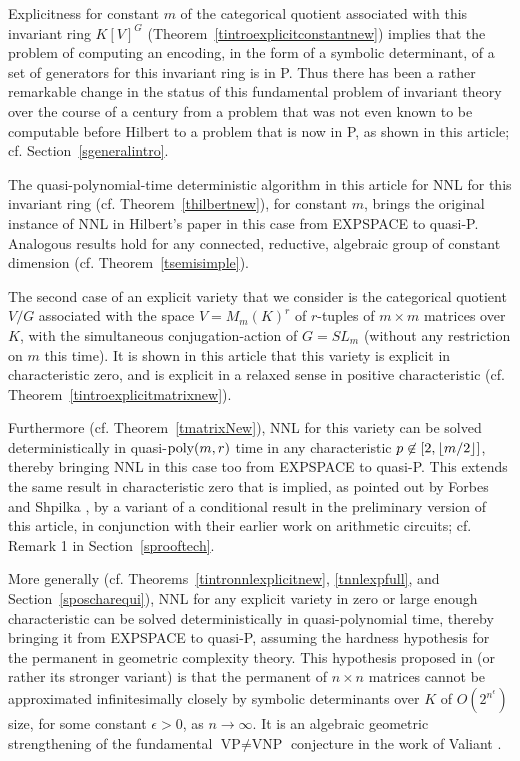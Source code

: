 \documentclass[11pt]{article}
\begin{document}
Explicitness  for constant $m$ of the categorical quotient  associated with 
this invariant ring $K[V]^G$ (Theorem~\ref{tintroexplicitconstantnew})
implies that 
the problem  of computing an  encoding, in the form of a symbolic determinant,
of a set of generators for this invariant ring  is in P.
Thus there has been a rather remarkable change in  the status of this fundamental problem 
of invariant theory over  the course of a century from a problem 
that was not even known to be computable 
before Hilbert to a problem that is now in P, as shown in this article;  cf. Section~\ref{sgeneralintro}.

The quasi-polynomial-time deterministic algorithm in this article for NNL for this invariant ring
(cf. Theorem~\ref{thilbertnew}),
for constant $m$,   brings  the  original instance of NNL in Hilbert's paper in this case 
from EXPSPACE to quasi-P. 
Analogous results hold for any connected, reductive, algebraic group of constant dimension (cf. Theorem~\ref{tsemisimple}).

The second case of an explicit variety that we consider is the categorical quotient $V/G$ \cite{mumford}  associated with
the space $V=M_m(K)^r$ of $r$-tuples of $m\times m$ matrices over $K$, with 
the  simultaneous conjugation-action  of $G=SL_m$ (without any restriction on $m$ this time). 
It is shown in this article that this variety is  explicit in characteristic
zero, and is  explicit in a relaxed sense in positive  characteristic (cf. Theorem~\ref{tintroexplicitmatrixnew}).

Furthermore (cf. Theorem~\ref{tmatrixNew}), 
NNL for this variety can be solved deterministically 
in quasi-${\mbox {poly}}(m,r)$  time
in any  characteristic $p \not \in [2,{\lfloor m/2 \rfloor}]$, thereby bringing NNL in this case too from EXPSPACE to quasi-P.
This extends the same result in characteristic zero that is implied,  as pointed out by Forbes and
Shpilka \cite{fs3},  by  a variant of a conditional result 
in the preliminary version \cite{GCT5focs} of this article, in conjunction with
their earlier work  \cite{fs2} on arithmetic circuits;
cf. Remark 1  in Section~\ref{sprooftech}.

More generally  (cf. Theorems~\ref{tintronnlexplicitnew}, \ref{tnnlexpfull},  and Section~\ref{sposcharequi}), 
NNL for any explicit variety in zero or large enough characteristic
can be solved deterministically in quasi-polynomial time, thereby bringing it from
EXPSPACE to quasi-P, assuming the  hardness hypothesis for the permanent 
in   geometric complexity theory.
This hypothesis proposed in  \cite{GCT1} (or rather its stronger variant)  is that 
the permanent of $n\times n$ matrices 
cannot be approximated infinitesimally closely  by symbolic determinants over $K$
of  $O(2^{n^\epsilon})$ size, for some constant $\epsilon >0$, as $n\rightarrow \infty$.
It is an algebraic geometric  strengthening 
of the fundamental $\mbox{VP} \not = \mbox{VNP}$ conjecture in the work of  Valiant \cite{valiant2}.
\end{document}
